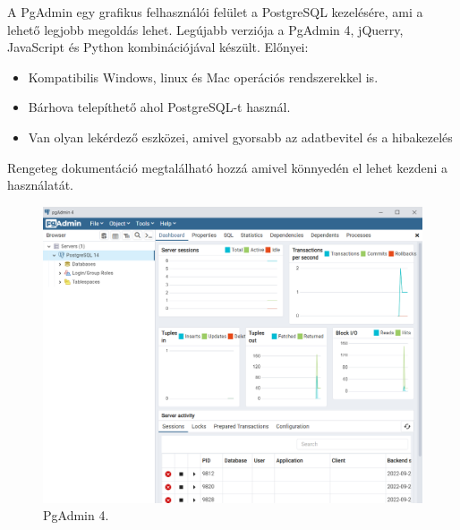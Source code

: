 A PgAdmin egy grafikus felhasználói felület a PostgreSQL kezelésére, ami a lehető legjobb megoldás lehet. Legújabb verziója a PgAdmin 4, jQuerry, JavaScript és Python kombinációjával készült. Előnyei:

\begin{itemize}
\item Kompatibilis Windows, linux és Mac operációs rendszerekkel is.
\item Bárhova telepíthető ahol PostgreSQL-t használ.
\item Van olyan lekérdező eszközei, amivel gyorsabb az adatbevitel és a hibakezelés
\end{itemize}

Rengeteg dokumentáció megtalálható hozzá amivel könnyedén el lehet kezdeni a használatát.

\begin{figure}[h]
\centering
\includegraphics[scale=0.5]{images/PgAdmin.png}
\caption{PgAdmin 4.}
\label{fig:PgAdmin 4}
\end{figure}
\newpage


